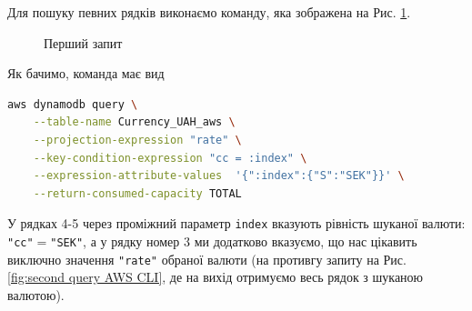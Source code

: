 \documentclass[a4paper,14pt]{extarticle} %
\begin{document}
Для пошуку певних рядків виконаємо команду, яка зображена на Рис. \ref{fig:first query AWS CLI}.

\begin{figure}[H]
    \caption{Перший запит}
    \label{fig:first query AWS CLI}
\end{figure}

\newpage

Як бачимо, команда має вид

\begin{lstlisting}[language=bash, stringstyle=\small\ttfamily, emphstyle={[1]\small\ttfamily}]
    aws dynamodb query \
    --table-name Currency_UAH_aws \
    --projection-expression "rate" \
    --key-condition-expression "cc = :index" \
    --expression-attribute-values  '{":index":{"S":"SEK"}}' \
    --return-consumed-capacity TOTAL
\end{lstlisting}

У рядках 4-5 через проміжний параметр \texttt{index} вказують рівність шуканої валюти: \texttt{"cc"$=$"SEK"}, 
а у рядку номер 3 ми додатково вказуємо, що нас цікавить виключ\-но значення \texttt{"rate"} обраної валюти 
(на противгу запиту на Рис. \ref{fig:second query AWS CLI}, де на вихід отримуємо весь рядок з шуканою валютою).
\end{document}
